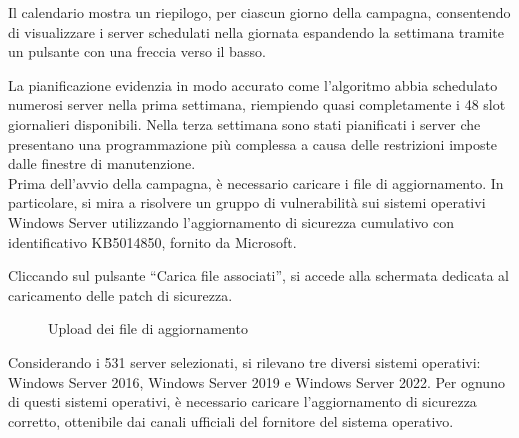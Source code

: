 Il calendario mostra un riepilogo, per ciascun giorno della campagna, 
consentendo di visualizzare i server schedulati nella giornata espandendo la 
settimana tramite un pulsante con una freccia verso il basso.

La pianificazione evidenzia in modo accurato come l'algoritmo abbia schedulato 
numerosi server nella prima settimana, riempiendo quasi completamente i 48 slot 
giornalieri disponibili. Nella terza settimana sono stati pianificati i server 
che presentano una programmazione più complessa a causa delle restrizioni imposte 
dalle finestre di manutenzione.\\

Prima dell'avvio della campagna, è necessario caricare i file di aggiornamento. 
In particolare, si mira a risolvere un gruppo di vulnerabilità sui sistemi 
operativi Windows Server utilizzando l'aggiornamento di sicurezza cumulativo 
con identificativo KB5014850, fornito da Microsoft.

Cliccando sul pulsante “Carica file associati”, si accede alla schermata dedicata 
al caricamento delle patch di sicurezza.

\begin{figure}[H]
\begin{flushright}
    \centering
    \caption{Upload dei file di aggiornamento}
    \label{fig:Upload dei file di aggiornamento}
\end{flushright}
\end{figure}

Considerando i 531 server selezionati, si rilevano tre diversi sistemi operativi: 
Windows Server 2016, Windows Server 2019 e Windows Server 2022. Per ognuno di 
questi sistemi operativi, è necessario caricare l'aggiornamento di sicurezza 
corretto, ottenibile dai canali ufficiali del fornitore del sistema operativo.

